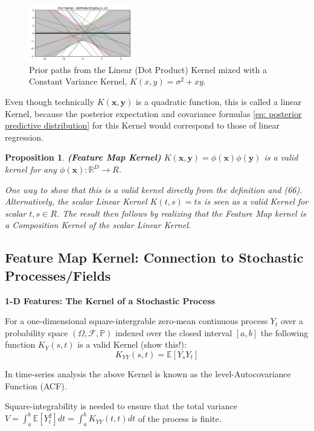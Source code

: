 \documentclass[11pt]{article}
\theoremstyle{plain} %
\newtheorem{proposition}[theorem]{Proposition}
\theoremstyle{remark}
\begin{document}
\begin{figure}[!htp]
  \centering
  \includegraphics[width=0.4\textwidth]{images/2023_11_26_5b299dbd302e8f129737g-35}
  \caption{Prior paths from the Linear (Dot Product) Kernel mixed with a Constant Variance Kernel, $K(x, y)=\sigma^{2}+x y$.}
  \label{fig:Linear (Dot Product) Kernel}
\end{figure}

Even though technically $K(\mathbf{x}, \mathbf{y})$ is a quadratic function,
this is called a linear Kernel, because the posterior expectation and covariance
formulas \cref{eq: posterior predictive distribution} for this Kernel would correspond to those of linear regression.

\begin{proposition}\textbf{(Feature Map Kernel)}
  $K(\mathbf{x}, \mathbf{y})=\phi(\mathbf{x}) \phi(\mathbf{y})$ is a valid
  kernel for any $\phi(\mathbf{x}): \mathbb{R}^{D} \rightarrow R$.

  One way to show that this is a valid kernel directly from the
  definition and (66). Alternatively, the scalar Linear Kernel $K(t, s)=t s$ is
  seen as a valid Kernel for scalar $t, s \in R$. The result then follows by
  realizing that the Feature Map kernel is a Composition Kernel of the scalar
  Linear Kernel.
\end{proposition}


\subsection{Feature Map Kernel: Connection to Stochastic Processes/Fields}
\textbf{1-D Features: The Kernel of a Stochastic Process}

For a one-dimensional square-intergrable zero-mean continuous process $Y_{t}$
over a probability space $(\Omega, \mathcal{F}, \mathbb{P})$ indexed over the closed
interval $[a, b]$ the following function $K_{Y}(s, t)$ is a valid Kernel (show
this!):
$$
  K_{Y Y}(s, t)=\mathbb{E}\left[Y_{s} Y_{t}\right]
$$

In time-series analysis the above Kernel is known as the level-Autocovariance
Function (ACF).

Square-integrability is needed to ensure that the total variance $V=\int_{a}^{b}
  \mathbb{E}\left[Y_{t}^{2}\right] d t=\int_{a}^{b} K_{Y Y}(t, t) d t$ of the
process is finite.
\end{document}
